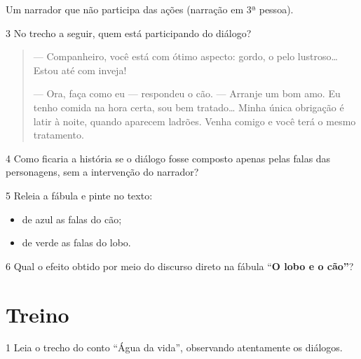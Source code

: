 \begin{conteudo}
\begin{conteudo}
\begin{conteudo}
\begin{conteudo}
\begin{boxlist}
 Um narrador que não participa das ações (narração em 3ª pessoa).
\end{boxlist}

\num{3} No trecho a seguir, quem está participando do diálogo?

\begin{quote}
--- Companheiro, você está com ótimo aspecto: gordo, o pelo
lustroso\ldots{} Estou até com inveja!

--- Ora, faça como eu --- respondeu o cão. --- Arranje um bom amo. Eu
tenho comida na hora certa, sou bem tratado\ldots{} Minha única
obrigação é latir à noite, quando aparecem ladrões. Venha comigo e você
terá o mesmo tratamento.
\end{quote}


\pagebreak
\num{4} Como ficaria a história se o diálogo fosse composto apenas pelas falas
das personagens, sem a intervenção do narrador?



\num{5} Releia a fábula e pinte no texto:

\begin{itemize}
\item de azul as falas do cão;

\item de verde as falas do lobo.
\end{itemize}

\num{6} Qual o efeito obtido por meio do discurso direto na fábula ``\textbf{O lobo e o cão''}?


\section{Treino}

\num{1} Leia o trecho do conto ``Água da vida'', observando atentamente 
os diálogos.


\end{conteudo}
\end{conteudo}
\end{conteudo}
\end{conteudo}
